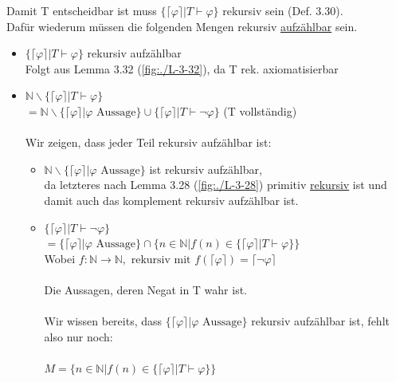 \documentclass[a4paper]{scrartcl}%
\begin{document}
    Damit T entscheidbar ist muss $\{\lceil \varphi \rceil | T \vdash \varphi \}$ rekursiv sein (Def. 3.30).\\
    Dafür wiederum müssen die folgenden Mengen rekursiv \underline{aufzählbar} sein.\\
    \begin{itemize}
        \item $\{\lceil \varphi \rceil | T \vdash \varphi \}$ rekursiv aufzählbar\\
            Folgt aus Lemma 3.32 (\ref{fig:./L-3-32}), da T rek. axiomatisierbar\\
        \item $\mathds{N} \backslash \{\lceil \varphi \rceil | T \vdash \varphi \}$\\
            $= \mathds{N} \backslash \{\lceil \varphi \rceil | \varphi \text{ Aussage}\} \cup \{\lceil \varphi \rceil | T \vdash \neg \varphi\}$ (T vollständig)\\
            \\Wir zeigen, dass jeder Teil rekursiv aufzählbar ist:\\
            \begin{itemize}
                \item $ \mathds{N} \backslash \{\lceil \varphi \rceil | \varphi \text{ Aussage}\}$ ist rekursiv aufzählbar,\\
                    da letzteres nach Lemma 3.28 (\ref{fig:./L-3-28}) primitiv \underline{rekursiv} ist und damit auch das komplement rekursiv aufzählbar ist.\\
                \item $\{\lceil \varphi \rceil | T \vdash \neg \varphi\}$\\
                    $= \{\lceil \varphi \rceil | \varphi \text{ Aussage}\} \cap \{n \in \mathds{N} | f(n) \in \{\lceil \varphi \rceil | T \vdash \varphi\}\}$\\
                    Wobei $f: \mathds{N} \rightarrow \mathds{N}, \text{ rekursiv mit } f(\lceil \varphi \rceil) = \lceil \neg \varphi \rceil$\\
                    \\Die Aussagen, deren Negat in T wahr ist.\\
                    \\Wir wissen bereits, dass $\{\lceil \varphi \rceil | \varphi \text{ Aussage}\}$ rekursiv aufzählbar ist, fehlt also nur noch:\\
                    \\$M = \{n \in \mathds{N} | f(n) \in \{\lceil \varphi \rceil | T \vdash \varphi\}\}$\\

\end{itemize}
\end{itemize}
\end{document}

